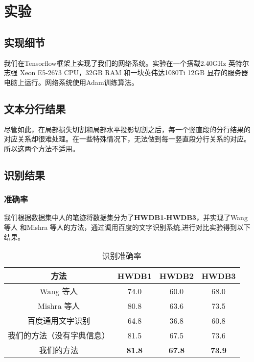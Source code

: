 \documentclass[winfonts]{njuthesis}
\begin{document}
\chapter{实验}

\section{实现细节}
我们在Tensorflow框架上实现了我们的网络系统。实验在一个搭载2.40GHz 英特尔志强 Xeon E5-2673 CPU，32GB RAM 和一块英伟达1080Ti 12GB 显存的服务器电脑上运行。网络系统使用Adam训练算法。



\section{文本分行结果}
尽管如此，在局部损失切割和局部水平投影切割之后，每一个竖直段的分行结果的对应关系却很难处理。在一些特殊情况下，无法做到每一竖直段分行关系的对应。所以这两个方法不适用。




\section{识别结果}

\subsection{准确率}
我们根据数据集中人的笔迹将数据集分为了\textbf{HWDB1}-\textbf{HWDB3}，并实现了Wang 等人\cite{wang2012end} 和Mishra 等人\cite{mishra2012scene}的方法，通过调用百度的文字识别系统\cite{baiduapi},进行对比实验得到以下结果。

\vspace{0.2cm}
\begin{table}[htbp]
\setlength{\belowcaptionskip}{5pt}
  \centering
  \begin{tabular}{cccc}
    \toprule
    \textbf{方法} & \textbf{HWDB1} & \textbf{HWDB2} & \textbf{HWDB3} \\
    \midrule
    Wang 等人\cite{wang2012end}   			& 74.0 & 60.0 & 68.0  \\
    Mishra 等人\cite{mishra2012scene}		 	& 80.8 & 63.6 & 73.5  \\
    百度通用文字识别\cite{baiduapi}		& 64.8 & 36.8 & 60.8 \\
    \midrule
    我们的方法（没有字典信息）& 81.5 & 67.5 & 73.6  \\
    我们的方法	  		& \textbf{81.8} & \textbf{67.8} & \textbf{73.9}  \\
    \bottomrule
  \end{tabular}
  \vspace{0.2cm}
  \caption{识别准确率}\label{table:result}
\end{table}
\end{document}
